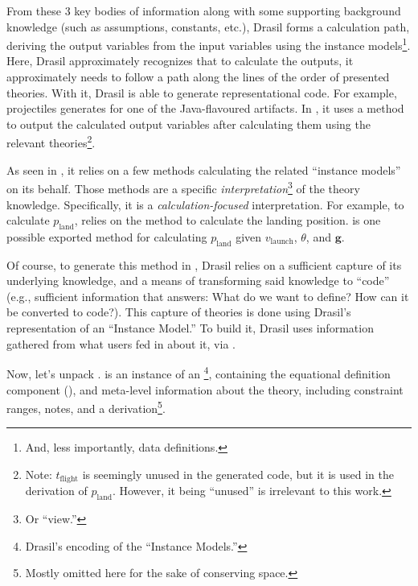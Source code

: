 From these 3 key bodies of information along with some supporting background
knowledge (such as assumptions, constants, etc.), Drasil forms a calculation
path, deriving the output variables from the input variables using the instance
models\footnote{And, less importantly, data definitions.}. Here, Drasil
approximately recognizes that to calculate the outputs, it approximately needs
to follow a path along the lines of the order of presented theories. With it,
Drasil is able to generate representational code. For example, \acsp{projectile}
generates  for one of the Java-flavoured
artifacts. In , it uses a
 method to output the calculated output variables
after calculating them using the relevant theories\footnote{Note:
\(t_\text{flight}\) is seemingly unused in the generated code, but it is used in
the derivation of \(p_\text{land}\). However, it being ``unused'' is irrelevant
to this work.}.

\originalJavaProjectileMain{}

As seen in , it relies on a few methods
calculating the related ``instance models'' on its behalf. Those methods are a
specific \textit{interpretation}\footnote{Or ``view.''} of the theory knowledge.
Specifically, it is a \textit{calculation-focused} interpretation. For example,
to calculate \(p_\text{land}\),  relies on the
method  to calculate the landing position.
 is one possible exported method for
calculating \(p_\text{land}\) given \(v_\text{launch}\), \(\theta\), and
\(\mathbf{g}\).

\originalJavaProjectilePLandMethod{}

Of course, to generate this method in ,
Drasil relies on a sufficient capture of its underlying knowledge, and a means
of transforming said knowledge to ``code'' (e.g., sufficient information that
answers: What do we want to define? How can it be converted to code?). This
capture of theories is done using Drasil's representation of an ``Instance
Model.'' To build it, Drasil uses information gathered from what users fed in
about it, via .

\originalLandPosTheoryDefinition{}

Now, let's unpack .  is
an instance of an \InstanceModel{}\footnote{Drasil's encoding of the ``Instance
    Models.''}, containing the equational definition component
(), and meta-level information about the theory, including
constraint ranges, notes, and a derivation\footnote{Mostly omitted here for the
    sake of conserving space.}.

